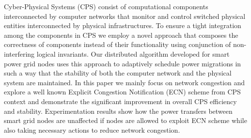 \label{sec:abstract}

Cyber-Physical Systems (CPS) consist of computational components interconnected by computer networks that monitor and control switched physical entities interconnected by physical infrastructures. To ensure a tight integration among the components in CPS we employ a novel approach that composes the correctness of components instead of their functionality using conjunction of non-interfering logical invariants. Our distributed algorithm developed for smart power grid nodes uses this approach to adaptively schedule power migrations in such a way that the stability of both the computer network and the physical system are maintained. In this paper we mainly focus on network congestion and explore a well known Explicit Congestion Notification (ECN) scheme from CPS context and demonstrate the significant improvement in overall CPS efficiency and stability. Experimentation results show how the power transfers between smart grid nodes are unaffected if nodes are allowed to exploit ECN scheme while also taking necessary actions to reduce network congestion.